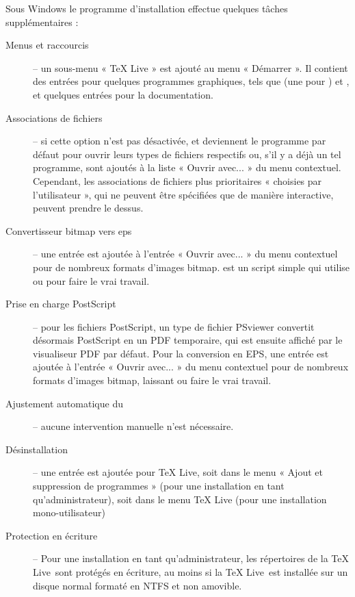 \documentclass[german, english, french, 12pt]{article}
\renewcommand{\TL}{\TeX{} Live\xspace}%
\begin{document}
Sous Windows le programme d'installation effectue quelques tâches
supplémentaires :
\begin{description}
\item[Menus et raccourcis] -- un sous-menu « \TL{} » est ajouté au menu
  « Démarrer ». Il contient des entrées pour quelques programmes graphiques,
  tels que  (une \GUI{} pour ) et , et
  quelques entrées pour la documentation.

\item[Associations de fichiers] -- si cette option n'est pas désactivée,
   et  deviennent le programme par défaut pour
  ouvrir leurs types de fichiers respectifs ou, s'il y a déjà un tel programme,
  sont ajoutés à la liste « Ouvrir avec... » du menu contextuel. Cependant, les
  associations de fichiers plus prioritaires « choisies par l'utilisateur », qui
  ne peuvent être spécifiées que de manière interactive, peuvent prendre le
  dessus.

\item[Convertisseur bitmap vers eps] -- une entrée  est
  ajoutée à l'entrée « Ouvrir avec... » du menu contextuel pour de nombreux
  formats d'images bitmap.  est un script simple qui utilise
   ou  pour faire le vrai travail.

\item[Prise en charge PostScript] -- pour les fichiers PostScript, un type de
  fichier PSviewer convertit désormais PostScript en un PDF temporaire, qui est
  ensuite affiché par le visualiseur PDF par défaut. Pour la conversion en EPS,
  une entrée  est ajoutée à l'entrée « Ouvrir avec... » du
  menu contextuel pour de nombreux formats d'images bitmap, laissant
   ou  faire le vrai travail.

\item[Ajustement automatique du ] -- aucune intervention manuelle
  n'est nécessaire.

\item[Désinstallation] -- une entrée est ajoutée pour \TL{}, soit dans le menu
  « Ajout et suppression de programmes » (pour une installation en tant
  qu'administrateur), soit dans le menu \TL{} (pour une installation
  mono-utilisateur)

\item[Protection en écriture] -- Pour une installation en tant
  qu'administrateur, les répertoires de la \TL\ sont protégés en écriture, au
  moins si la \TL\ est installée sur un disque normal formaté en NTFS et non
  amovible.
\end{description}
\end{document}
